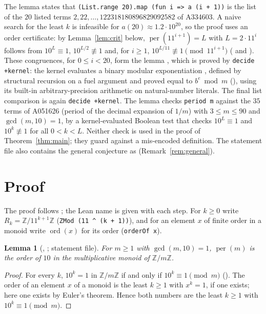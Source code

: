 \documentclass[11pt]{amsart}
\theoremstyle{plain}
\newtheorem{lemma}[theorem]{Lemma}
\theoremstyle{definition}
\newcommand{\Z}{\mathbb{Z}}
\newcommand{\ord}{\operatorname{ord}}
\newcommand{\per}{\operatorname{per}}
\begin{document}
The lemma  states that \texttt{(List.range 20).map (fun i => a (i + 1))} is the list of the $20$ listed terms $2,22,\dots,122318180896829092582$ of A334603. A naive search for the least $k$ is infeasible for $a(20)\approx1.2\cdot10^{20}$, so the proof uses an order certificate: by Lemma~\ref{lem:crit} below, $\per(11^{i+1})=L$ with $L=2\cdot11^i$ follows from $10^L\equiv1$, $10^{L/2}\not\equiv1$ and, for $i\ge1$, $10^{L/11}\not\equiv1\pmod{11^{i+1}}$ ( and ). These congruences, for $0\le i<20$, form the lemma , which is proved by \texttt{decide +kernel}: the kernel evaluates a binary modular exponentiation , defined by structural recursion on a fuel argument and proved equal to $b^e \bmod m$ (), using its built-in arbitrary-precision arithmetic on natural-number literals. The final list comparison is again \texttt{decide +kernel}.
The lemma  checks \texttt{period m} against the $35$ terms of A051626 \cite{A051626} (period of the decimal expansion of $1/m$) with $3\le m\le 90$ and $\gcd(m,10)=1$, by a kernel-evaluated Boolean test  that checks $10^L\equiv1$ and $10^k\not\equiv1$ for all $0<k<L$.
Neither check is used in the proof of Theorem~\ref{thm:main}; they guard against a mis-encoded definition.
The statement file also contains the general conjecture as  (Remark~\ref{rem:general}).

\section{Proof}\label{sec:proof}

The proof follows ; the Lean name is given with each step. For $k\ge0$ write $R_k=\Z/11^{k+1}\Z$ (\texttt{ZMod (11 \^{} (k + 1))}), and for an element $x$ of finite order in a monoid write $\ord(x)$ for its order (\texttt{orderOf x}).

\begin{lemma}[, ; statement file]\label{lem:orderOf}
For $m\ge1$ with $\gcd(m,10)=1$, $\per(m)$ is the order of $10$ in the multiplicative monoid of $\Z/m\Z$.
\end{lemma}

\begin{proof}
For every $k$, $10^k=1$ in $\Z/m\Z$ if and only if $10^k\equiv1\pmod m$ (). The order of an element $x$ of a monoid is the least $k\ge1$ with $x^k=1$, if one exists; here one exists by Euler's theorem. Hence both numbers are the least $k\ge1$ with $10^k\equiv1\pmod m$.
\end{proof}
\end{document}
